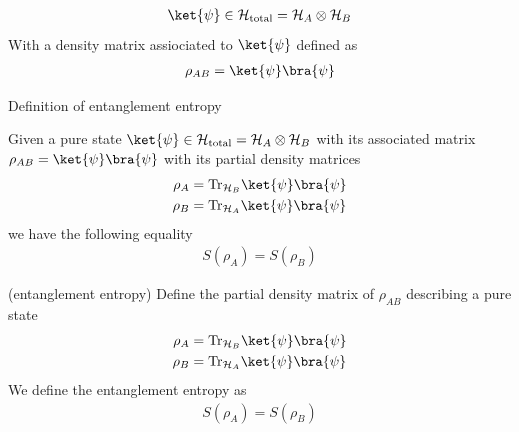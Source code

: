  \begin{align*} 
	\ket{\psi} \in \mathcal{H}_{\text{total}} =  \mathcal{H}_{A} \otimes \mathcal{H}_B
\end{align*}
With a density matrix assiociated to $\ket{\psi}$ defined as 
\begin{align*} 
	\rho_{AB} = \ket{\psi}\bra{\psi} 
\end{align*}
\begin{parag}{Definition of entanglement entropy}
	\begin{theoreme}
	Given a pure state $\ket{\psi} \in \mathcal{H}_{\text{total}} = \mathcal{H}_A \otimes \mathcal{H}_B$ with its associated matrix $\rho_{AB} = \ket{\psi}\bra{\psi}$ with its partial density matrices
	\begin{align*} 
		\rho_A &=  \text{Tr}_{\mathcal{H}_B}\ket{\psi}\bra{\psi}\\
		\rho_B &= \text{Tr}_{\mathcal{H}_A} \ket{\psi}\bra{\psi}
	\end{align*}
	we have the following equality
	\begin{align*} 
		S\left(\rho_A\right)  = S\left(\rho_B\right)
	\end{align*}
	\end{theoreme}



	\begin{definition}{(entanglement entropy)}
	Define the partial density matrix of $\rho_{AB}$ describing a pure state 
	\begin{align*} 
		\rho_A &=  \text{Tr}_{\mathcal{H}_B}\ket{\psi}\bra{\psi}\\
		\rho_B &= \text{Tr}_{\mathcal{H}_A} \ket{\psi}\bra{\psi}
	\end{align*}
	We define the entanglement entropy as 
	\begin{align*} 
		S\left(\rho_A\right) = S\left(\rho_B\right) 
	\end{align*}
	\end{definition}
\end{parag}

